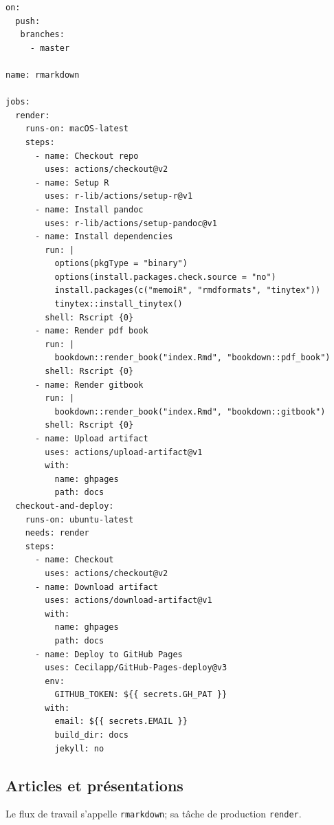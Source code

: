 \documentclass[
  12pt,
  french,
  a4paper,
  extrafontsizes,onecolumn,openright
  ]{memoir}
\begin{document}
\begin{verbatim}
on:
  push:
   branches:
     - master

name: rmarkdown

jobs:
  render:
    runs-on: macOS-latest
    steps:
      - name: Checkout repo
        uses: actions/checkout@v2
      - name: Setup R
        uses: r-lib/actions/setup-r@v1
      - name: Install pandoc
        uses: r-lib/actions/setup-pandoc@v1
      - name: Install dependencies
        run: |
          options(pkgType = "binary")
          options(install.packages.check.source = "no")
          install.packages(c("memoiR", "rmdformats", "tinytex"))
          tinytex::install_tinytex()
        shell: Rscript {0}
      - name: Render pdf book
        run: |
          bookdown::render_book("index.Rmd", "bookdown::pdf_book")
        shell: Rscript {0}
      - name: Render gitbook
        run: |
          bookdown::render_book("index.Rmd", "bookdown::gitbook")
        shell: Rscript {0}
      - name: Upload artifact
        uses: actions/upload-artifact@v1
        with:
          name: ghpages
          path: docs
  checkout-and-deploy:
    runs-on: ubuntu-latest
    needs: render
    steps:
      - name: Checkout
        uses: actions/checkout@v2
      - name: Download artifact
        uses: actions/download-artifact@v1
        with:
          name: ghpages
          path: docs
      - name: Deploy to GitHub Pages
        uses: Cecilapp/GitHub-Pages-deploy@v3
        env:
          GITHUB_TOKEN: ${{ secrets.GH_PAT }}
        with:
          email: ${{ secrets.EMAIL }}
          build_dir: docs
          jekyll: no
\end{verbatim}

\hypertarget{articles-et-pruxe9sentations}{%
\subsection{Articles et présentations}\label{articles-et-pruxe9sentations}}

Le flux de travail s'appelle \texttt{rmarkdown}; sa tâche de production \texttt{render}.
\end{document}
